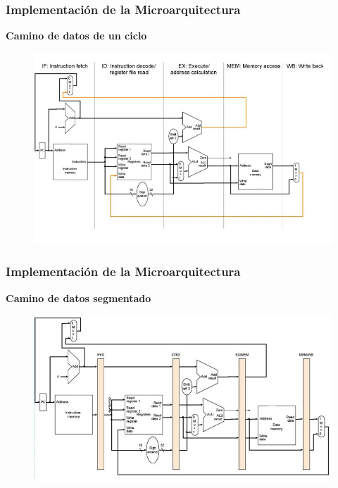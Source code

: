 \documentclass[aspectratio=169,compress]{beamer}
\begin{document}
\begin{footnotesize}
\begin{frame}
\end{frame}








\begin{frame}
\frametitle{Implementación de la Microarquitectura}
\begin{center}\textbf{Camino de datos de un ciclo}\end{center}
\begin{figure}
\includegraphics[scale=0.3]{images/single.jpg} 
\end{figure}

\end{frame}




\begin{frame}
\frametitle{Implementación de la Microarquitectura}
\begin{center}\textbf{Camino de datos segmentado}\end{center}
\begin{figure}
\includegraphics[scale=0.3]{images/pipelined.jpg} 
\end{figure}


\end{frame}
\end{footnotesize}
\end{document}
